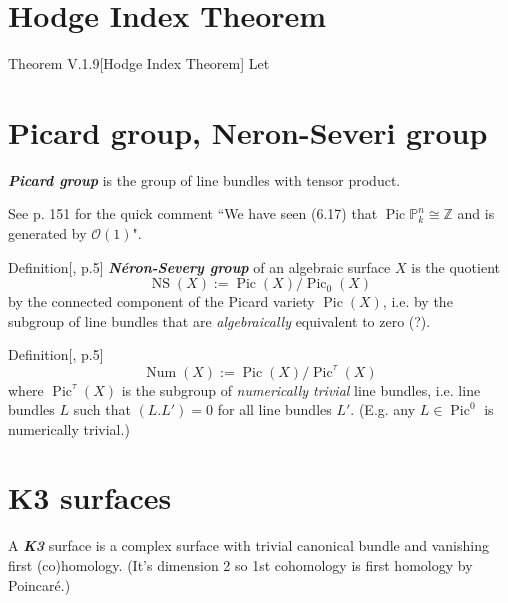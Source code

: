 \section{Hodge Index Theorem}

\begin{thing4}{Theorem V.1.9}[Hodge Index Theorem]\label{prop:V.1.9}\leavevmode
Let
\end{thing4}

\section{Picard group, Neron-Severi group}

\begin{defn}[dani]\leavevmode
\textit{\textbf{Picard group}} is the group of line bundles with tensor product.
\end{defn}

\begin{remark}\leavevmode
See \cite{hart} p. 151 for the quick comment ``We have seen (6.17) that \(\operatorname{Pic}\mathbb{P}^n_k \cong\mathbb{Z}\) and is generated by \(\mathcal{O}(1)\)".
\end{remark}

\begin{thing4}{Definition}[\cite{huk}, p.5]\leavevmode
\textit{\textbf{Néron-Severy group}} of an algebraic surface \(X\) is the quotient
\[\operatorname{NS}(X):=\operatorname{Pic}(X) /\operatorname{Pic}_0(X)\]
by the connected component of the Picard variety \(\operatorname{Pic}(X)\), i.e. by the subgroup of line bundles that are \textit{algebraically} equivalent to zero (?).
\end{thing4}

\begin{thing4}{Definition}[\cite{huk}, p.5]\label{prop:}\leavevmode
\[\operatorname{Num}(X):=\operatorname{Pic}(X)/\operatorname{Pic}^\tau(X)\]
where \(\operatorname{Pic}^\tau(X)\) is the subgroup of \textit{numerically trivial} line bundles, i.e. line bundles \(L\) such that \((L.L')=0\) for all line bundles \(L'\). (E.g. any  \(L \in \operatorname{Pic}^0\) is numerically trivial.) 
\end{thing4}

\section{K3 surfaces}
\begin{defn}[dani]\leavevmode
A \textit{\textbf{K3}} surface is a complex surface with trivial canonical bundle and vanishing first (co)homology. (It's dimension 2 so 1st cohomology is first homology by Poincaré.)
\end{defn}

